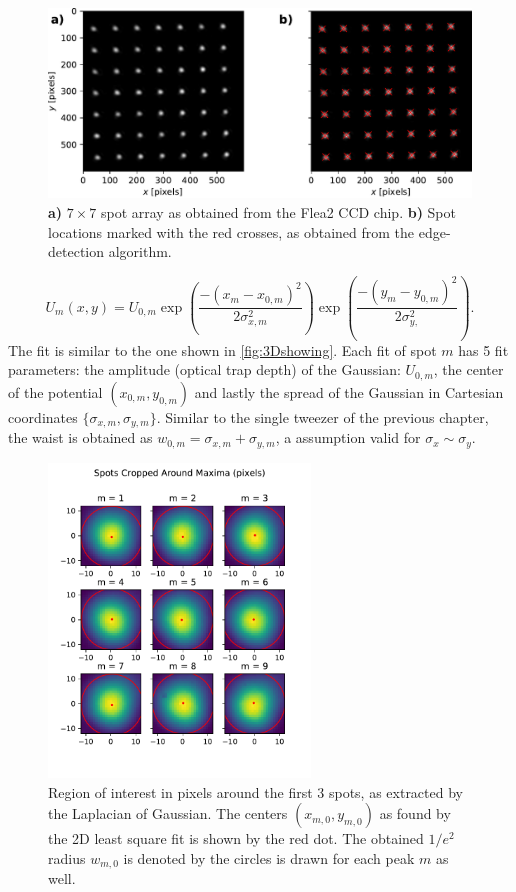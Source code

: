 \begin{figure}
    \centering
    \includegraphics[width=\textwidth]{figures/CamImgLoGSpots.pdf}
    \caption{\textsf{\textbf{a)}} $7\times7$ spot array as obtained from the Flea2 CCD chip.
    \textsf{\textbf{b)}} Spot locations marked with the red crosses, as obtained from the edge-detection algorithm. }
    \label{fig:CameraLoG}
\end{figure}

\begin{equation}\label{eq:2DGaussianNumberK}
    U_m(x,y) = U_{0,m}\exp{\left(\frac{-(x_m-x_{0,m})^2}{2\sigma_{x,m}^2}\right)}
    \exp{\left( \frac{-(y_m-y_{0,m})^2}{2\sigma_{y,}^2} \right)}.
\end{equation}
The fit is similar to the one shown in \cref{fig:3Dshowing}.
Each fit of spot $m$ has 5 fit parameters: the amplitude (optical trap depth) of the Gaussian: $U_{0,m}$, the center of the potential $(x_{0,m}, y_{0,m})$ and lastly the spread of the Gaussian in Cartesian coordinates $\{\sigma_{x,m},\sigma_{y,m}\}$.
Similar to the single tweezer of the previous chapter, the waist is obtained as $w_{0,m} = \sigma_{x,m}+\sigma_{y,m}$, a assumption valid for $\sigma_x\sim\sigma_y$.
\begin{figure}
    \centering
    \includegraphics[width=0.62\textwidth]{figures/SpotsCropped_range12.pdf}
    \caption{Region of interest in pixels around the first 3 spots, as extracted by the Laplacian of Gaussian. 
    The centers $(x_{m,0},y_{m,0})$ as found by the 2D least square fit is shown by the red dot. 
    The obtained $1/e^2$ radius $w_{m,0}$ is denoted by the circles is drawn for each peak $m$ as well.}
    \label{fig:SpotsRoI}
\end{figure}

